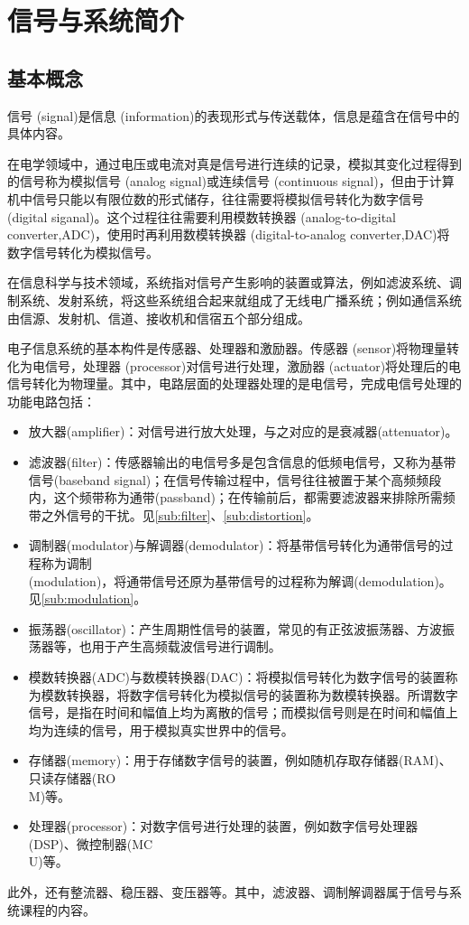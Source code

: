 \section{信号与系统简介}\label{sec:Introduction}

\subsection{基本概念}\label{sub:basic_concepts}
信号 (signal)是信息 (information)的表现形式与传送载体，信息是蕴含在信号中的具体内容。

在电学领域中，通过电压或电流对真是信号进行连续的记录，模拟其变化过程得到的信号称为模拟信号 (analog signal)或连续信号 (continuous signal)，但由于计算机中信号只能以有限位数的形式储存，往往需要将模拟信号转化为数字信号(digital siganal)。这个过程往往需要利用模数转换器 (analog-to-digital converter,ADC)，使用时再利用数模转换器 (digital-to-analog converter,DAC)将数字信号转化为模拟信号。

在信息科学与技术领域，系统指对信号产生影响的装置或算法，例如滤波系统、调制系统、发射系统，将这些系统组合起来就组成了无线电广播系统；例如通信系统由信源、发射机、信道、接收机和信宿五个部分组成。

电子信息系统的基本构件是传感器、处理器和激励器。传感器 (sensor)将物理量转化为电信号，处理器 (processor)对信号进行处理，激励器 (actuator)将处理后的电信号转化为物理量。其中，电路层面的处理器处理的是电信号，完成电信号处理的功能电路包括：\begin{itemize}
    \item 放大器(amplifier)：对信号进行放大处理，与之对应的是衰减器(attenuator)。
    \item 滤波器(filter)：传感器输出的电信号多是包含信息的低频电信号，又称为基带信号(baseband signal)；在信号传输过程中，信号往往被置于某个高频频段内，这个频带称为通带(passband)；在传输前后，都需要滤波器来排除所需频带之外信号的干扰。见\ref{sub:filter}、\ref{sub:distortion}。
    \item 调制器(modulator)与解调器(demodulator)：将基带信号转化为通带信号的过程称为调制\\
    (modulation)，将通带信号还原为基带信号的过程称为解调(demodulation)。见\ref{sub:modulation}。
    \item 振荡器(oscillator)：产生周期性信号的装置，常见的有正弦波振荡器、方波振荡器等，也用于产生高频载波信号进行调制。
    \item 模数转换器(ADC)与数模转换器(DAC)：将模拟信号转化为数字信号的装置称为模数转换器，将数字信号转化为模拟信号的装置称为数模转换器。所谓数字信号，是指在时间和幅值上均为离散的信号；而模拟信号则是在时间和幅值上均为连续的信号，用于模拟真实世界中的信号。
    \item 存储器(memory)：用于存储数字信号的装置，例如随机存取存储器(RAM)、只读存储器(RO\\
    M)等。
    \item 处理器(processor)：对数字信号进行处理的装置，例如数字信号处理器(DSP)、微控制器(MC\\
    U)等。
\end{itemize}
此外，还有整流器、稳压器、变压器等。其中，滤波器、调制解调器属于信号与系统课程的内容。

